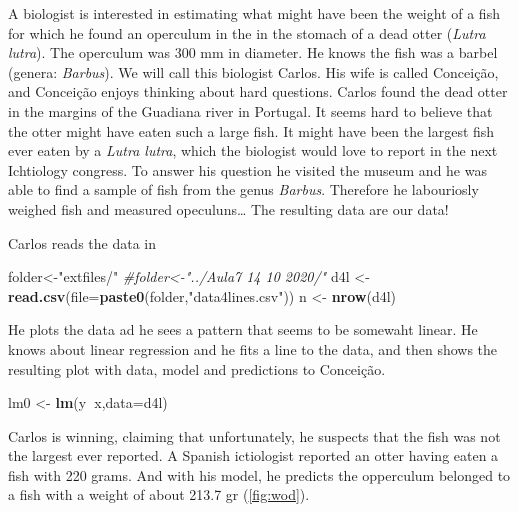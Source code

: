 \documentclass[
]{book}
\newenvironment{Shaded}{\begin{snugshade}}{\end{snugshade}}
\newcommand{\CommentTok}[1]{\textcolor[rgb]{0.56,0.35,0.01}{\textit{#1}}}
\newcommand{\DataTypeTok}[1]{\textcolor[rgb]{0.13,0.29,0.53}{#1}}
\newcommand{\KeywordTok}[1]{\textcolor[rgb]{0.13,0.29,0.53}{\textbf{#1}}}
\newcommand{\NormalTok}[1]{#1}
\newcommand{\OperatorTok}[1]{\textcolor[rgb]{0.81,0.36,0.00}{\textbf{#1}}}
\newcommand{\StringTok}[1]{\textcolor[rgb]{0.31,0.60,0.02}{#1}}
\begin{document}
A biologist is interested in estimating what might have been the weight of a fish for which he found an operculum in the in the stomach of a dead otter (\emph{Lutra lutra}). The operculum was 300 mm in diameter. He knows the fish was a barbel (genera: \emph{Barbus}). We will call this biologist Carlos. His wife is called Conceição, and Conceição enjoys thinking about hard questions. Carlos found the dead otter in the margins of the Guadiana river in Portugal. It seems hard to believe that the otter might have eaten such a large fish. It might have been the largest fish ever eaten by a \emph{Lutra lutra}, which the biologist would love to report in the next Ichtiology congress. To answer his question he visited the museum and he was able to find a sample of fish from the genus \emph{Barbus}. Therefore he labouriosly weighed fish and measured opeculuns\ldots{} The resulting data are our data!

Carlos reads the data in

\begin{Shaded}
\begin{Highlighting}[]
\NormalTok{folder<-}\StringTok{"extfiles/"}
\CommentTok{#folder<-"../Aula7 14 10 2020/"}
\NormalTok{d4l <-}\StringTok{ }\KeywordTok{read.csv}\NormalTok{(}\DataTypeTok{file=}\KeywordTok{paste0}\NormalTok{(folder,}\StringTok{"data4lines.csv"}\NormalTok{))}
\NormalTok{n <-}\StringTok{ }\KeywordTok{nrow}\NormalTok{(d4l)}
\end{Highlighting}
\end{Shaded}

He plots the data ad he sees a pattern that seems to be somewaht linear. He knows about linear regression and he fits a line to the data, and then shows the resulting plot with data, model and predictions to Conceição.

\begin{Shaded}
\begin{Highlighting}[]
\NormalTok{lm0 <-}\StringTok{ }\KeywordTok{lm}\NormalTok{(y}\OperatorTok{~}\NormalTok{x,}\DataTypeTok{data=}\NormalTok{d4l)}
\end{Highlighting}
\end{Shaded}

Carlos is winning, claiming that unfortunately, he suspects that the fish was not the largest ever reported. A Spanish ictiologist reported an otter having eaten a fish with 220 grams. And with his model, he predicts the opperculum belonged to a fish with a weight of about 213.7 gr (\ref{fig:wod}).
\end{document}
